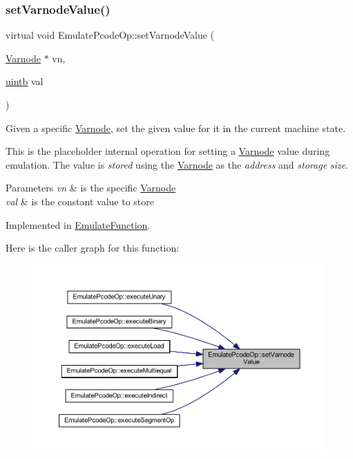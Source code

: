 \subsubsection{\texorpdfstring{setVarnodeValue()}{setVarnodeValue()}}
{\footnotesize\ttfamily virtual void Emulate\+Pcode\+Op\+::set\+Varnode\+Value (\begin{DoxyParamCaption}\item[{\mbox{\hyperlink{class_varnode}{Varnode}} $\ast$}]{vn,  }\item[{\mbox{\hyperlink{types_8h_a2db313c5d32a12b01d26ac9b3bca178f}{uintb}}}]{val }\end{DoxyParamCaption})\hspace{0.3cm}{\ttfamily [pure virtual]}}



Given a specific \mbox{\hyperlink{class_varnode}{Varnode}}, set the given value for it in the current machine state. 

This is the placeholder internal operation for setting a \mbox{\hyperlink{class_varnode}{Varnode}} value during emulation. The value is {\itshape stored} using the \mbox{\hyperlink{class_varnode}{Varnode}} as the {\itshape address} and {\itshape storage} {\itshape size}. 
\begin{DoxyParams}{Parameters}
{\em vn} & is the specific \mbox{\hyperlink{class_varnode}{Varnode}} \\
\hline
{\em val} & is the constant value to store \\
\hline
\end{DoxyParams}


Implemented in \mbox{\hyperlink{class_emulate_function_a9b130aee822f3e00552259a3ecaf14ff}{Emulate\+Function}}.

Here is the caller graph for this function\+:
\nopagebreak
\begin{figure}[H]
\begin{center}
\leavevmode
\includegraphics[width=350pt]{class_emulate_pcode_op_a44bfa9a3b6d87135a6bfc6680d01ea27_icgraph}
\end{center}
\end{figure}


